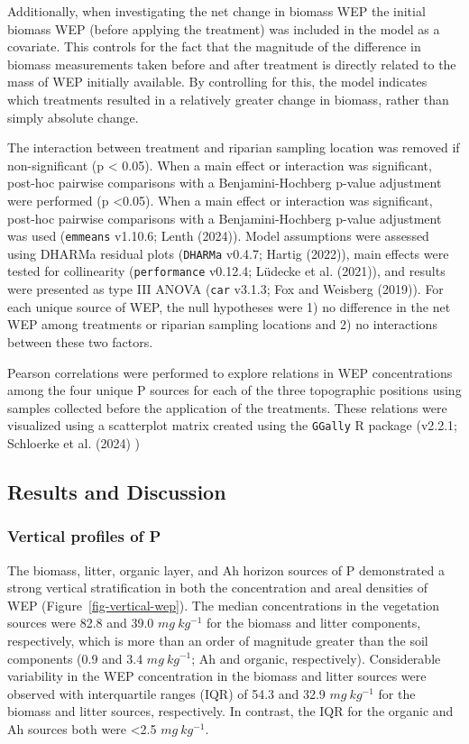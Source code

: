 \documentclass[
]{agujournal2019}
\begin{document}
Additionally, when investigating the net change in biomass WEP the
initial biomass WEP (before applying the treatment) was included in the
model as a covariate. This controls for the fact that the magnitude of
the difference in biomass measurements taken before and after treatment
is directly related to the mass of WEP initially available. By
controlling for this, the model indicates which treatments resulted in a
relatively greater change in biomass, rather than simply absolute
change.

The interaction between treatment and riparian sampling location was
removed if non-significant (p \textless{} 0.05). When a main effect or
interaction was significant, post-hoc pairwise comparisons with a
Benjamini-Hochberg p-value adjustment were performed (p \textless0.05).
When a main effect or interaction was significant, post-hoc pairwise
comparisons with a Benjamini-Hochberg p-value adjustment was used
(\texttt{emmeans} v1.10.6; Lenth (2024)). Model assumptions were
assessed using DHARMa residual plots (\texttt{DHARMa} v0.4.7; Hartig
(2022)), main effects were tested for collinearity (\texttt{performance}
v0.12.4; Lüdecke et al. (2021)), and results were presented as type III
ANOVA (\texttt{car} v3.1.3; Fox and Weisberg (2019)). For each unique
source of WEP, the null hypotheses were 1) no difference in the net WEP
among treatments or riparian sampling locations and 2) no interactions
between these two factors.

Pearson correlations were performed to explore relations in WEP
concentrations among the four unique P sources for each of the three
topographic positions using samples collected before the application of
the treatments. These relations were visualized using a scatterplot
matrix created using the \texttt{GGally} R package (v2.2.1; Schloerke et
al. (2024) )

\subsection{Results and Discussion}\label{results-and-discussion}

\subsubsection{Vertical profiles of P}\label{vertical-profiles-of-p}

The biomass, litter, organic layer, and Ah horizon sources of P
demonstrated a strong vertical stratification in both the concentration
and areal densities of WEP (Figure~\ref{fig-vertical-wep}). The median
concentrations in the vegetation sources were 82.8 and 39.0
\(mg~kg^{-1}\) for the biomass and litter components, respectively,
which is more than an order of magnitude greater than the soil
components (0.9 and 3.4 \(mg~kg^{-1}\); Ah and organic, respectively).
Considerable variability in the WEP concentration in the biomass and
litter sources were observed with interquartile ranges (IQR) of 54.3 and
32.9 \(mg~kg^{-1}\) for the biomass and litter sources, respectively. In
contrast, the IQR for the organic and Ah sources both were \textless2.5
\(mg~kg^{-1}\).
\end{document}
